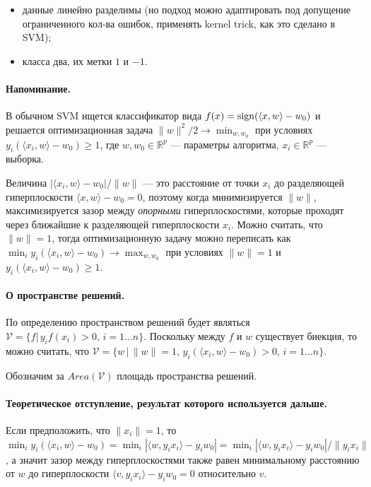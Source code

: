 \documentclass[specialist, 12pt, href]{article}
\begin{document}
\begin{itemize}
\item
  данные линейно разделимы (но подход можно адаптировать под допущение
  ограниченного кол-ва ошибок, применять kernel trick, как это сделано в
  SVM);
\item
  класса два, их метки \(1\) и \(-1\).
\end{itemize}

\paragraph{Напоминание.}

В обычном SVM ищется классификатор вида
\(f(x) = {\rm sign}(\langle x, w \rangle - w_0)\) и решается
оптимизационная задача \(\|w\|^2/2 \to \min_{w, w_0}\) при условиях
\(y_i(\langle x_i, w \rangle - w_0) \geq 1\), где \(w, w_0 \in \mathbb{R}^p\) ---
параметры алгоритма, \(x_i \in \mathbb{R}^p\) --- выборка.

Величина \(|\langle x_i, w \rangle - w_0|/\|w\|\) --- это расстояние от
точки \(x_i\) до разделяющей гиперплоскости
\(\langle x, w \rangle - w_0 = 0\), поэтому когда минимизируется
\(\|w\|\), максимизируется зазор между \emph{опорными} гиперплоскостями,
которые проходят через ближайшие к разделяющей гиперплоскости \(x_i\).
Можно считать, что \(\|w\| = 1\), тогда оптимизационную задачу можно
переписать как
\(\min_i y_i (\langle x_i, w \rangle - w_0) \to \max_{w, w_0}\) при
условиях \(\|w\| = 1\) и \(y_i(\langle x_i, w \rangle - w_0) \geq 1\).

\paragraph{О пространстве
решений.}

По определению пространством решений будет являться
\(\mathcal{V} = \{f |\, y_if(x_i) > 0,\, i = 1 \ldots n\}\). Поскольку
между \(f\) и \(w\) существует биекция, то можно считать, что
\(\mathcal{V} = \{w\,|\, \|w\| = 1,\, y_i (\langle x_i, w \rangle - w_0) > 0,\, i = 1\ldots n \}\).

Обозначим за \(Area(\mathcal{V})\) площадь пространства решений.

\paragraph{Теоретическое отступление, результат которого используется
дальше.}

Если предположить, что \(\|x_i\| = 1\), то
\(\min_i y_i(\langle x_i, w \rangle - w_0) = \min_i |\langle w, y_i x_i\rangle - y_i w_0| = \min_i |\langle w, y_i x_i\rangle - y_i w_0|/\|y_ix_i\|\),
а значит зазор между гиперплоскостями также равен минимальному
расстоянию от \(w\) до гиперплоскости
\(\langle v, y_i x_i\rangle - y_i w_0 = 0\) относительно \(v\).
\end{document}
